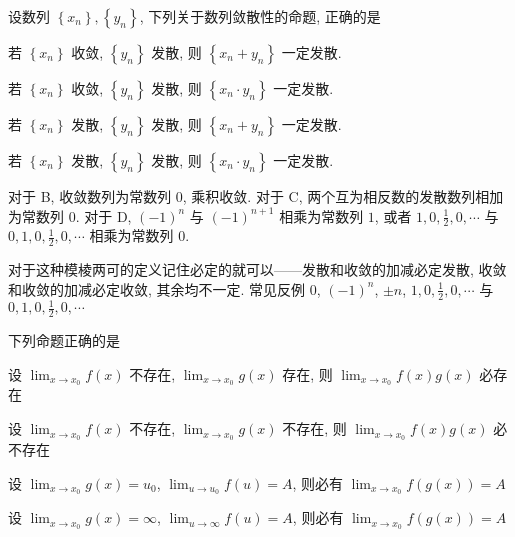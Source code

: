 \begin{question}
  设数列 $\left\{x_n\right\},\left\{y_n\right\}$,
  下列关于数列敛散性的命题,
  正确的是
  \paren[A]
  \begin{choices}
    \item 若 $\left\{x_n\right\}$ 收敛, $\left\{y_n\right\}$ 发散,
    则 $\left\{x_n+y_n\right\}$ 一定发散.
    \item 若 $\left\{x_n\right\}$ 收敛, $\left\{y_n\right\}$ 发散,
    则 $\left\{x_n \cdot y_n\right\}$ 一定发散.
    \item 若 $\left\{x_n\right\}$ 发散, $\left\{y_n\right\}$ 发散,
    则 $\left\{x_n+y_n\right\}$ 一定发散.
    \item 若 $\left\{x_n\right\}$ 发散, $\left\{y_n\right\}$ 发散,
    则 $\left\{x_n \cdot y_n\right\}$ 一定发散.
  \end{choices}
\end{question}

\begin{analysis}
  对于 B,
  收敛数列为常数列 $0$,
  乘积收敛.
  对于 C,
  两个互为相反数的发散数列相加为常数列 $0$.
  对于 D, $(-1)^n$ 与 $(-1)^{n+1}$ 相乘为常数列 $1$,
  或者 $1, 0, \frac{1}{2}, 0, \cdots$ 与 $0, 1, 0, \frac{1}{2}, 0, \cdots$ 相乘为常数列 $0$.
\end{analysis}

\begin{notes}[][][green]
  对于这种模棱两可的定义记住必定的就可以——发散和收敛的加减必定发散,
  收敛和收敛的加减必定收敛,
  其余均不一定.
  常见反例 $0$, $(-1)^n$, $\pm n$, $1, 0, \frac{1}{2}, 0, \cdots$ 与 $0, 1, 0, \frac{1}{2}, 0, \cdots$
\end{notes}

\begin{question}
  下列命题正确的是
  \paren[D]
  \begin{choices}
    \item 设 $\lim_{x \to x_{0}} f(x)$ 不存在, $\lim_{x \to x_{0}} g(x)$ 存在,
    则 $\lim_{x \to x_{0}} f(x) g(x)$ 必存在
    \item 设 $\lim_{x \to x_{0}} f(x)$ 不存在, $\lim_{x \to x_{0}} g(x)$ 不存在,
    则 $\lim_{x \to x_{0}} f(x) g(x)$ 必不存在
    \item 设 $\lim_{x \to x_{0}} g(x) = u_{0}$, $\lim_{u \to u_{0}} f(u) = A$,
    则必有 $\lim_{x \to x_{0}} f(g(x)) = A$
    \item 设 $\lim_{x \to x_0} g(x)= \infty$, $\lim_{u \to \infty} f(u) = A$,
    则必有 $\lim_{x \to x_{0}} f(g(x)) = A$
  \end{choices}
\end{question}

